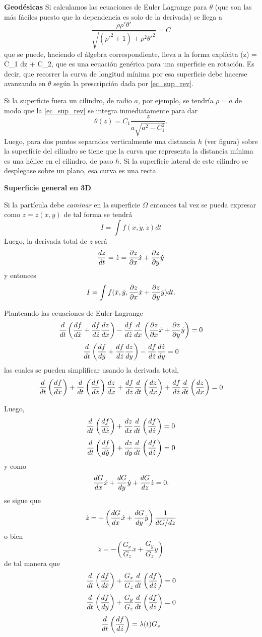 \documentclass[10pt,oneside]{CBFT_book}
\begin{document}
\begin{ejemplo}{\bf Geodésicas}
Si calculamos las ecuaciones de Euler Lagrange para $\theta$ (que son las más fáciles puesto que
la dependencia es solo de la derivada) se llega a
\[
	\frac{\rho \rho' \theta' }{\sqrt{ ( {\rho'}^2 + 1) + \rho^2 {\theta'}^2 }} = C
\]
que se puede, haciendo el álgebra correspondiente, lleva a la forma explícita
\be
	\theta(z) = C_1 \int {} dz + C_2,
	\label{ec_sup_rev}
\ee
que es una ecuación genérica para una superficie en rotación. Es decir, que recorrer la curva
de longitud mínima por esa superficie debe hacerse avanzando en $\theta$ según la prescripción
dada por \eqref{ec_sup_rev}.

Si la superficie fuera un cilindro, de radio $a$, por ejemplo, se tendría $\rho=a$ de modo que la
\eqref{ec_sup_rev} se integra inmediatamente para dar 
\[
	\theta(z) = C_1 \frac{z}{ a \sqrt{ a^2 - C_1^2 } } .
\]
Luego, para dos puntos separados verticalmente una distancia $h$ (ver figura) sobre la superficie
del cilindro se tiene que la curva que representa la distancia mínima es una hélice en el cilindro,
de paso $h$. Si la superficie lateral de este cilindro se desplegase sobre un plano, esa curva es
una recta.

{\bf Superficie general en 3D}

Si la partícula debe {\it caminar} en la superficie $\Omega$ entonces tal vez se pueda expresar
como $z=z(x,y)$ de tal forma se tendrá
\[
	I = \int f(\dot{x},\dot{y},\dot{z}) dt
\]
Luego, la derivada total de $z$ será
\[
	\dtot{z}{t} = \dot{z} = \dpar{z}{x} \dot{x} + \dpar{z}{y} \dot{y}
\]
y entonces 
\[
	I = \int f(\dot{x},\dot{y},\dpar{z}{x} \dot{x} + \dpar{z}{y} \dot{y}) dt.
\]

Planteando las ecuaciones de Euler-Lagrange 
\[
	\dtot{}{t}\left( \dtot{f}{\dot{x}} + \dtot{f}{\dot{z}}\dtot{z}{x} \right) -
	\dtot{f}{\dot{z}}\dtot{}{x}
	\left( \dpar{z}{x} \dot{x} + \dpar{z}{y} \dot{y} \right) = 0
\]
\[
	\dtot{}{t}\left( \dtot{f}{\dot{y}} + \dtot{f}{\dot{z}}\dtot{z}{y} \right) -
	\dtot{f}{\dot{z}}\dtot{\dot{z}}{y} = 0
\]
las cuales se pueden simplificar usando la derivada total,
\[
	\dtot{}{t}\left( \dtot{f}{\dot{x}} \right) + \dtot{}{t}\left( \dtot{f}{\dot{z}} \right)
	\dtot{z}{x} + \dtot{f}{\dot{z}}\dtot{}{t}\left( \dtot{z}{x} \right) + 
	\dtot{f}{\dot{z}}\dtot{}{t}\left( \dtot{z}{x} \right) = 0
\]

Luego,
\[
	\dtot{}{t}\left( \dtot{f}{\dot{x}} \right) + 
	\dtot{z}{x}\dtot{}{t}\left( \dtot{f}{\dot{z}} \right) = 0
\]
\[
	\dtot{}{t}\left( \dtot{f}{\dot{y}} \right) + 
	\dtot{z}{y}\dtot{}{t}\left( \dtot{f}{\dot{z}} \right) = 0
\]
y como
\[
	\dtot{G}{x}\dot{x} + \dtot{G}{y}\dot{y} + \dtot{G}{z}\dot{z} = 0,
\]
se sigue que 
\[
	\dot{z} = -\left( \dtot{G}{x}\dot{x} + \dtot{G}{y}\dot{y} \right) \frac{1}{dG/dz}
\]
o bien
\[
	\dot{z} = -\left( \frac{G_x}{G_z}\dot{x} + \frac{G_y}{G_z}\dot{y} \right)
\]
de tal manera que 
\[
	\dtot{}{t}\left( \dtot{f}{\dot{x}} \right) + 
	\frac{G_x}{G_z}\dtot{}{t}\left( \dtot{f}{\dot{z}} \right) = 0
\]
\[
	\dtot{}{t}\left( \dtot{f}{\dot{y}} \right) + 
	\frac{G_y}{G_z}\dtot{}{t}\left( \dtot{f}{\dot{z}} \right) = 0
\]
\[
	\dtot{}{t}\left( \dtot{f}{\dot{z}} \right) = \lambda(t) G_z
\]


\end{ejemplo}
\end{document}
